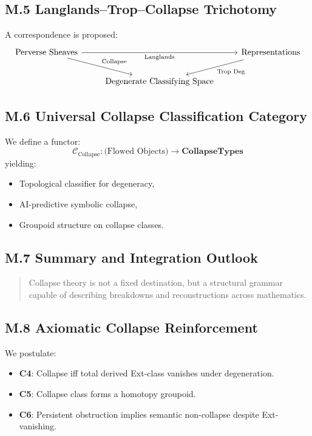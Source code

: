 \documentclass[11pt]{article}
\begin{document}
\begin{axiom}
\begin{axiom}
{{\subsection*{M.5 Langlands–Trop–Collapse Trichotomy}

A correspondence is proposed:
\[
\begin{tikzcd}
\text{Perverse Sheaves} \arrow[dr, "\text{Collapse}"] \arrow[rr, "\text{Langlands}"'] & & \text{Representations} \arrow[dl, "\text{Trop Deg}"] \\
& \text{Degenerate Classifying Space} &
\end{tikzcd}
\]

\subsection*{M.6 Universal Collapse Classification Category}

We define a functor:
\[
\mathcal{C}_{\text{Collapse}} : \text{(Flowed Objects)} \to \mathbf{CollapseTypes}
\]
yielding:
\begin{itemize}
  \item Topological classifier for degeneracy,
  \item AI-predictive symbolic collapse,
  \item Groupoid structure on collapse classes.
\end{itemize}

\subsection*{M.7 Summary and Integration Outlook}

\begin{quote}
Collapse theory is not a fixed destination, but a structural grammar  
capable of describing breakdowns and reconstructions across mathematics.
\end{quote}

\subsection*{M.8 Axiomatic Collapse Reinforcement}

We postulate:
\begin{itemize}
  \item \textbf{C4}: Collapse iff total derived Ext-class vanishes under degeneration.
  \item \textbf{C5}: Collapse class forms a homotopy groupoid.
  \item \textbf{C6}: Persistent obstruction implies semantic non-collapse despite Ext-vanishing.
\end{itemize}

}}
\end{axiom}
\end{axiom}
\end{document}
